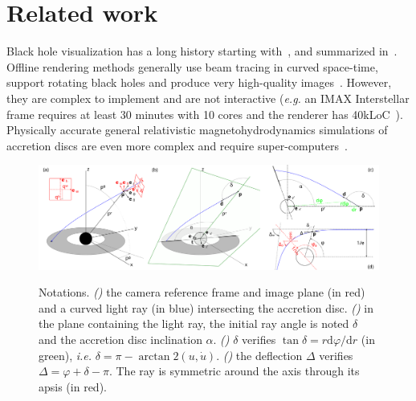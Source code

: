 \documentclass{document}
\newcommand{\diff}{\mathrm d}
\begin{document}
\section{Related work}\label{sec:relatedwork}

Black hole visualization has a long history starting with~\cite{Luminet1979}, 
and summarized in~\cite{Luminet2019}. Offline rendering methods generally use  
beam tracing in curved space-time, support rotating black holes and produce 
very high-quality images~\cite{Hamilton2014,Riazuelo2014,James2015}. However, 
they are complex to implement and are not interactive ({\em e.g.} an IMAX 
Interstellar frame requires at least 30 minutes with 10 cores and the renderer 
has 40kLoC~\cite{James2015}). Physically accurate general relativistic 
magnetohydrodynamics simulations of accretion discs are even more complex and 
require super-computers~\cite{MNRAS2018}.

\begin{figure}[htb]
	\centering
	\includegraphics[width=\linewidth]{figures/notations}
	{\label{fig:notations:a}}
	{\label{fig:notations:b}}
	{\label{fig:notations:c}}
	{\label{fig:notations:d}}
	\caption{Notations. {\em ()} the camera reference 
	frame and image plane (in red) and a curved light ray (in blue) intersecting 
	the accretion disc. {\em ()} in the plane containing 
	the light ray, the initial ray angle is noted $\delta$ and the accretion disc 
	inclination $\alpha$. {\em ()} $\delta$ verifies 
	$\tan\delta = r \diff\varphi / \diff r$ (in green), {\em i.e.} 
	$\delta = \pi - \arctan2(u, \dot{u})$. {\em ()} the 
	deflection $\Delta$ verifies $\Delta = \varphi + \delta - \pi$. The ray is 
	symmetric around the axis through its apsis (in red).}
\end{figure}
\end{document}
